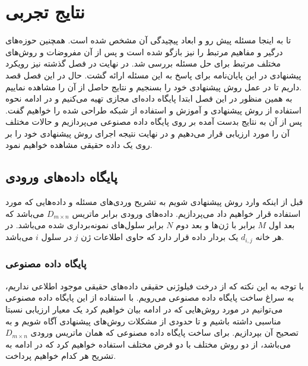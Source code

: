 
\chapter{نتایج تجربی}

تا به اینجا مسئله پیش رو و ابعاد پیچیدگی آن مشخص شده است. همچنین حوزه‌های درگیر و مفاهیم مرتبط را نیز بازگو شده است و پس از آن مفروضات و روش‌های مختلف مرتبط برای حل مسئله بررسی شد. 
در نهایت در فصل گذشته نیز رویکرد پیشنهادی در این پایان‌نامه برای پاسخ به این مسئله ارائه گشت. حال در این فصل قصد داریم تا در عمل روش پیشنهادی خود را بسنجیم و نتایج حاصل از آن را مشاهده نماییم.
\\
به همین منظور در این فصل ابتدا پایگاه داده‌ای مجازی تهیه می‌کنیم و در ادامه نحوه استفاده از روش پیشنهادی و آموزش و استفاده از شبکه طراحی شده را خواهیم گفت. پس از آن به نتایج بدست آمده بر روی پایگاه داده مصنوعی می‌پردازیم و حالات مختلف آن را مورد ارزیابی قرار می‌دهیم و در نهایت نتیجه اجرای روش پیشنهادی خود را بر روی یک داده حقیقی مشاهده خواهیم نمود.

\section{پایگاه داده‌های ورودی}
قبل از اینکه وارد روش پیشنهادی شویم به تشریح وردی‌های مسئله و داده‌هایی که مورد استفاده قرار خواهیم داد می‌پردازیم.
داده‌های ورودی برابر ماتریس $D_{m\times n}$ می‌باشد که بعد اول $M$ برابر با ژن‌ها و بعد دوم $N$ برابر سلول‌های نمونه‌برداری شده می‌باشد. در هر خانه $d_{i,j}$ یک بردار داده قرار دارد که حاوی اطلاعات ژن $j$ در سلول $i$ می‌باشد.

\subsection[پایگاه داده مصنوعی]
{پایگاه داده مصنوعی
}

با توجه به این نکته که از درخت فیلوژنی حقیقی داده‌های حقیقی موجود اطلاعی نداریم، به سراغ ساخت پایگاه‌ داده مصنوعی می‌رویم. با استفاده از این پایگاه داده مصنوعی می‌توانیم در مورد روش‌هایی که در ادامه بیان خواهیم کرد یک معیار ارزیابی نسبتا مناسبی داشته باشیم و تا حدودی از مشکلات روش‌های پیشنهادی آگاه شویم و به تصحیح آن بپردازیم. برای ساخت پایگاه داده مصنوعی که همان ماتریس ورودی $D_{m\times n}$ می‌باشد، از دو روش مختلف با دو فرض مختلف استفاده خواهیم کرد که در ادامه به تشریح هر کدام خواهیم پرداخت.


